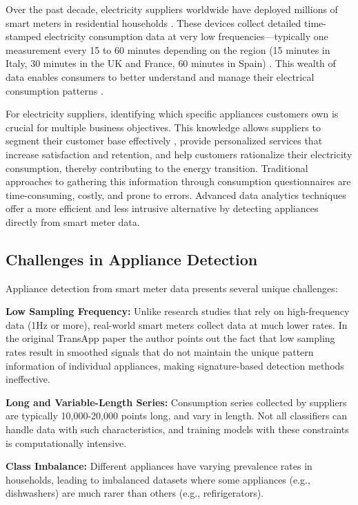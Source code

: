 \documentclass[conference]{IEEEtran}
\begin{document}
Over the past decade, electricity suppliers worldwide have deployed millions of smart meters in residential households \cite{chren2016smart, milam2014smart}. These devices collect detailed time-stamped electricity consumption data at very low frequencies—typically one measurement every 15 to 60 minutes depending on the region (15 minutes in Italy, 30 minutes in the UK and France, 60 minutes in Spain) \cite{zhao2020non}. This wealth of data enables consumers to better understand and manage their electrical consumption patterns \cite{barai2015smart}.

For electricity suppliers, identifying which specific appliances customers own is crucial for multiple business objectives. This knowledge allows suppliers to segment their customer base effectively \cite{allcott2011social}, provide personalized services that increase satisfaction and retention, and help customers rationalize their electricity consumption, thereby contributing to the energy transition. Traditional approaches to gathering this information through consumption questionnaires are time-consuming, costly, and prone to errors. Advanced data analytics techniques offer a more efficient and less intrusive alternative by detecting appliances directly from smart meter data.

\subsection{Challenges in Appliance Detection}

Appliance detection from smart meter data presents several unique challenges:

\textbf{Low Sampling Frequency:} Unlike research studies that rely on high-frequency data (1Hz or more), real-world smart meters collect data at much lower rates. In the original TransApp paper the author points out the fact that low sampling rates result in smoothed signals that do not maintain the unique pattern information of individual appliances, making signature-based detection methods ineffective.

\textbf{Long and Variable-Length Series:} Consumption series collected by suppliers are typically 10,000-20,000 points long, and vary in length. Not all classifiers can handle data with such characteristics, and training models with these constraints is computationally intensive.

\textbf{Class Imbalance:} Different appliances have varying prevalence rates in households, leading to imbalanced datasets where some appliances (e.g., dishwashers) are much rarer than others (e.g., refirigerators).
\end{document}
